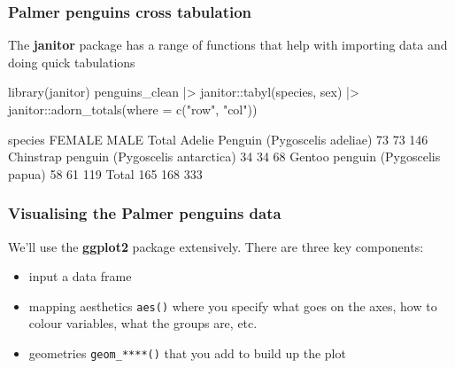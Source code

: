 \documentclass[a4paper]{article}
\begin{document}
\subsubsection{Palmer penguins cross tabulation}
The \textbf{janitor} package has a range of functions that help with importing data and doing quick tabulations
\begin{Schunk}
\begin{Sinput}
library(janitor)
penguins_clean |>
  janitor::tabyl(species, sex) |>
  janitor::adorn_totals(where = c("row", "col"))
\end{Sinput}
\begin{Soutput}
                                   species FEMALE MALE Total
       Adelie Penguin (Pygoscelis adeliae)     73   73   146
 Chinstrap penguin (Pygoscelis antarctica)     34   34    68
         Gentoo penguin (Pygoscelis papua)     58   61   119
                                     Total    165  168   333
\end{Soutput}
\end{Schunk}
\subsubsection{Visualising the Palmer penguins data}
We'll use the \textbf{ggplot2} package extensively. There are three key components:
\begin{itemize}
  	\item input a data frame
	\item mapping aesthetics \lstinline|aes()| where you specify what goes on the axes, how to
	colour variables, what the groups are, etc.
	\item geometries \lstinline|geom_****()| that you add to build up the plot
\end{itemize}
\end{document}
